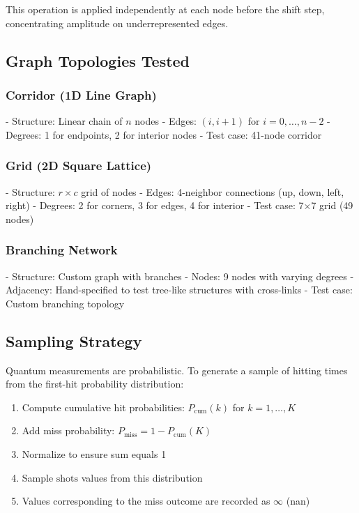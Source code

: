 \documentclass[12pt,a4paper]{article}
\begin{document}
This operation is applied independently at each node before the shift step, concentrating amplitude on underrepresented edges.

\subsection{Graph Topologies Tested}

\subsubsection{Corridor (1D Line Graph)}
- Structure: Linear chain of $n$ nodes
- Edges: $(i, i+1)$ for $i = 0, \ldots, n-2$
- Degrees: 1 for endpoints, 2 for interior nodes
- Test case: 41-node corridor

\subsubsection{Grid (2D Square Lattice)}
- Structure: $r \times c$ grid of nodes
- Edges: 4-neighbor connections (up, down, left, right)
- Degrees: 2 for corners, 3 for edges, 4 for interior
- Test case: 7$\times$7 grid (49 nodes)

\subsubsection{Branching Network}
- Structure: Custom graph with branches
- Nodes: 9 nodes with varying degrees
- Adjacency: Hand-specified to test tree-like structures with cross-links
- Test case: Custom branching topology

\subsection{Sampling Strategy}

Quantum measurements are probabilistic. To generate a sample of hitting times from the first-hit probability distribution:
\begin{enumerate}
    \item Compute cumulative hit probabilities: $P_{\text{cum}}(k)$ for $k = 1, \ldots, K$
    \item Add miss probability: $P_{\text{miss}} = 1 - P_{\text{cum}}(K)$
    \item Normalize to ensure sum equals 1
    \item Sample $\text{shots}$ values from this distribution
    \item Values corresponding to the miss outcome are recorded as $\infty$ (nan)
\end{enumerate}
\end{document}
